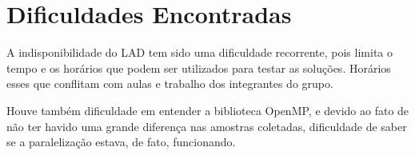 \section{Dificuldades Encontradas}

A indisponibilidade do LAD tem sido uma dificuldade recorrente, pois limita o tempo e os horários que podem ser utilizados para testar as soluções. Horários esses que conflitam com aulas e trabalho dos integrantes do grupo.

Houve também dificuldade em entender a biblioteca OpenMP, e devido ao fato de não ter havido uma grande diferença nas amostras coletadas, dificuldade de saber se a paralelização estava, de fato, funcionando.
